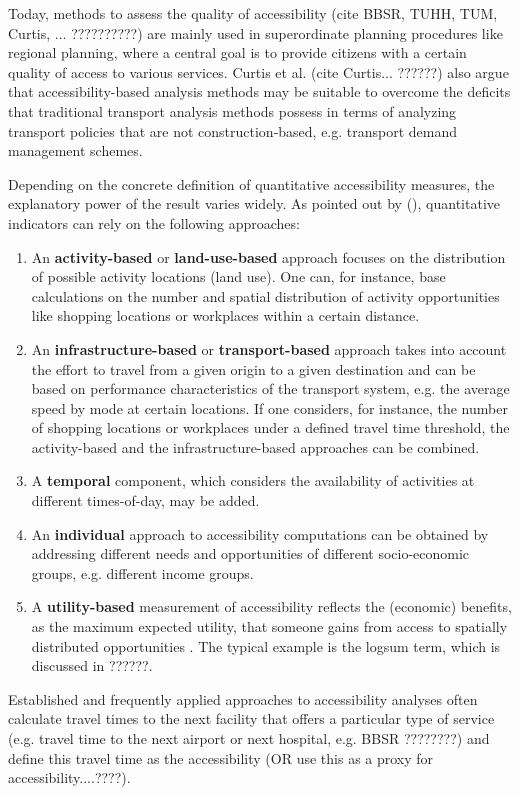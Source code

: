 Today, methods to assess the quality of accessibility (cite BBSR, TUHH, TUM, Curtis, ... ??????????) are mainly used in superordinate planning procedures like regional planning, where a central goal is to provide citizens with a certain quality of access to various services. Curtis et al. (cite Curtis... ??????) also argue that accessibility-based analysis methods may be suitable to overcome the deficits that traditional transport analysis methods possess in terms of analyzing transport policies that are not construction-based, e.g. transport demand management schemes.

Depending on the concrete definition of quantitative accessibility measures, the explanatory power of the result varies widely.
%
As pointed out by \citet{NicolaiNagel2012HiResAccessibilityMethodInBook} (\citep[see also][]{GeursRitsema2001AccessibilityMeasures,Geurs2004AccessibilityReview}), quantitative indicators can rely on the following approaches:
%
\begin{enumerate}
\item An \textbf{activity-based} or \textbf{land-use-based} approach focuses on
the distribution of possible activity locations (land use). One can, for instance,
base calculations on the number and spatial distribution of activity opportunities
like shopping locations or workplaces within a certain distance.
%
\item An \textbf{in\-fra\-struc\-ture-based} or \textbf{transport-based} approach takes into account the effort to travel from a given origin to a given destination and 
can be based on performance characteristics of the transport system, e.g. the
average speed by mode at certain locations. If one considers, for instance, the
number of shopping locations or workplaces under a defined travel time threshold,
the activity-based and the infrastructure-based approaches can be combined.
%
\item A \textbf{temporal} component, which considers the availability of activities at different times-of-day, may be added.
%
\item An \textbf{individual} approach to accessibility computations can be
obtained by addressing different needs and opportunities of different socio-economic groups, e.g. different income groups.
%
\item A \textbf{utility-based} measurement of accessibility reflects the
(economic) benefits, as the maximum expected utility, that someone gains
from access to spatially distributed opportunities
\citep{GeursRitsema2001AccessibilityMeasures,deJongEtAl2007LogsumTRA}. The
typical example is the logsum term, which is discussed in ??????.
\end{enumerate}
%
%
Established and frequently applied approaches to accessibility analyses often calculate travel times to the next facility that offers a particular type of service (e.g. travel time to the next airport or next hospital, e.g. BBSR ????????) and define this travel time as the accessibility (OR use this as a proxy for accessibility....????).

